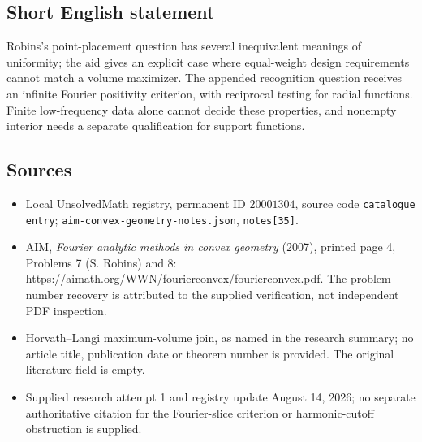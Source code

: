 \documentclass[11pt]{article}
\begin{document}
\subsection{Short English statement}
Robins's point-placement question has several inequivalent meanings of uniformity; the aid gives an explicit case where equal-weight design requirements cannot match a volume maximizer. The appended recognition question receives an infinite Fourier positivity criterion, with reciprocal testing for radial functions. Finite low-frequency data alone cannot decide these properties, and nonempty interior needs a separate qualification for support functions.
\subsection{Sources}
\begin{itemize}
\item Local UnsolvedMath registry, permanent ID \(20001304\), source code \texttt{catalogue entry}; \texttt{aim-convex-geometry-notes.json}, \texttt{notes[35]}.
\item AIM, \emph{Fourier analytic methods in convex geometry} (2007), printed page 4, Problems 7 (S. Robins) and 8: \url{https://aimath.org/WWN/fourierconvex/fourierconvex.pdf}. The problem-number recovery is attributed to the supplied verification, not independent PDF inspection.
\item Horvath--Langi maximum-volume join, as named in the research summary; no article title, publication date or theorem number is provided. The original literature field is empty.
\item Supplied research attempt 1 and registry update August 14, 2026; no separate authoritative citation for the Fourier-slice criterion or harmonic-cutoff obstruction is supplied.
\end{itemize}
\end{document}
